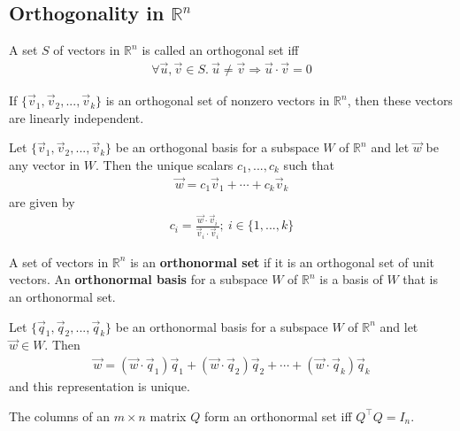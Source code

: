 \documentclass{article}
\begin{document}
\subsection{Orthogonality in $\mathbb{R}^n$}
\begin{definition}
	A set $S$ of vectors in $\mathbb{R}^n$ is called an orthogonal set iff
	\begin{align*}
		\forall \vec u, \vec v\in S.\: \vec u \not= \vec v \Rightarrow \vec u \cdot \vec v = 0
	\end{align*}
\end{definition}
\begin{theorem}
	If $\{\vec v_1, \vec v_2, ...,\vec v_k\}$ is an orthogonal set of nonzero vectors in $\mathbb{R}^n$, then these vectors are linearly independent.
\end{theorem}
\begin{theorem}
	Let $\{\vec v_1, \vec v_2, ..., \vec v_k\}$ be an orthogonal basis for a subspace $W$ of $\mathbb{R}^n$ and let $\vec w$ be any vector in $W$. Then the unique scalars $c_1, ..., c_k$ such that
	\begin{align*}
		\vec w = c_1\vec v_1 + \cdots + c_k\vec v_k
	\end{align*}
	are given by
	\begin{align*}
		c_i = \frac{\vec w \cdot \vec v_i}{\vec v_i \cdot \vec v_i}; \: i \in \{1, ..., k\}
	\end{align*}
\end{theorem}
\begin{definition}
	A set of vectors in $\mathbb{R}^n$ is an \textbf{orthonormal set} if it is an orthogonal set of unit vectors. An \textbf{orthonormal basis} for a subspace $W$ of $\mathbb{R}^n$ is a basis of $W$ that is an orthonormal set.
\end{definition}
\begin{theorem}
	Let $\{\vec q_1, \vec q_2, ..., \vec q_k\}$ be an orthonormal basis for a subspace $W$ of $\mathbb{R}^n$ and let $\vec w\in W$. Then
	\begin{align*}
		\vec w = (\vec w \cdot \vec q_1)\vec q_1 + (\vec w\cdot\vec q_2)\vec q_2 + \cdots + (\vec w\cdot\vec q_k)\vec q_k
	\end{align*}
	and this representation is unique.
\end{theorem}
\begin{theorem}
	The columns of an $m\times n$ matrix $Q$ form an orthonormal set iff $Q^\intercal Q=I_n$.
\end{theorem}
\end{document}
